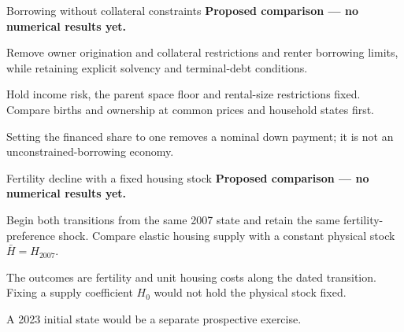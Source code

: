 \documentclass[11pt,aspectratio=169]{beamer}
\begin{document}
\begin{frame}{Borrowing without collateral constraints}
\small
\textbf{Proposed comparison --- no numerical results yet.}
\par\medskip
Remove owner origination and collateral restrictions and renter borrowing limits, while retaining explicit solvency and terminal-debt conditions.
\par\medskip
Hold income risk, the parent space floor and rental-size restrictions fixed. Compare births and ownership at common prices and household states first.
\par\medskip
Setting the financed share to one removes a nominal down payment; it is not an unconstrained-borrowing economy.
\end{frame}

\begin{frame}{Fertility decline with a fixed housing stock}
\small
\textbf{Proposed comparison --- no numerical results yet.}
\par\medskip
Begin both transitions from the same 2007 state and retain the same fertility-preference shock. Compare elastic housing supply with a constant physical stock $\bar H=H_{2007}$.
\par\medskip
The outcomes are fertility and unit housing costs along the dated transition. Fixing a supply coefficient $H_0$ would not hold the physical stock fixed.
\par\medskip
A 2023 initial state would be a separate prospective exercise.
\end{frame}
\end{document}
